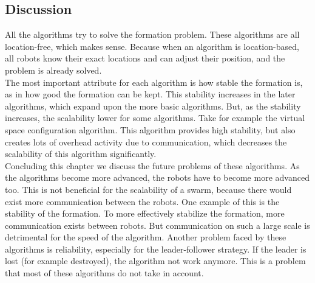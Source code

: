 \subsection{Discussion}
All the algorithms try to solve the formation problem. 
These algorithms are all location-free, which makes sense.  
Because when an algorithm is location-based, all robots know their exact locations and can adjust their position, and the problem is already solved. \\
The most important attribute for each algorithm is how stable the formation is, as in how good the formation can be kept. 
This stability increases in the later algorithms, which expand upon the more basic algorithms. 
But, as the stability increases, the scalability lower for some algorithms. 
Take for example the virtual space configuration algorithm. 
This algorithm provides high stability, but also creates lots of overhead activity due to communication, which decreases the scalability of this algorithm significantly.\\

Concluding this chapter we discuss the future problems of these algorithms. 
As the algorithms become more advanced, the robots have to become more advanced too.
This is not beneficial for the scalability of a swarm, because there would exist more communication between the robots. 
One example of this is the stability of the formation. 
To more effectively stabilize the formation, more communication exists between robots. 
But communication on such a large scale is detrimental for the speed of the algorithm. 
Another problem faced by these algorithms is reliability, especially for the leader-follower strategy. 
If the leader is lost (for example destroyed), the algorithm   not work anymore. 
This is a problem that most of these algorithms do not take in account.  
